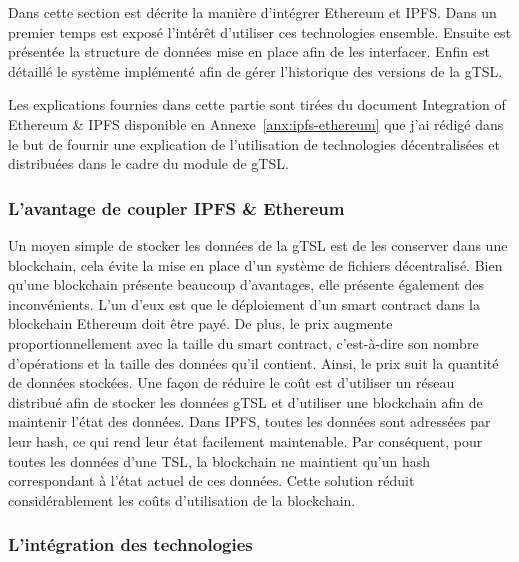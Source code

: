 \documentclass{tnreport}
\begin{document}
Dans cette section est décrite la manière d'intégrer Ethereum et IPFS. Dans un premier temps est exposé l'intérêt d'utiliser ces technologies ensemble. Ensuite est présentée la structure de données mise en place afin de les interfacer. Enfin est détaillé le système implémenté afin de gérer l'historique des versions de la gTSL.

Les explications fournies dans cette partie sont tirées du document Integration of Ethereum \& IPFS disponible en Annexe~\ref{anx:ipfs-ethereum} que j'ai rédigé dans le but de fournir une explication de l'utilisation de technologies décentralisées et distribuées dans le cadre du module de gTSL.

\subsubsection{L'avantage de coupler IPFS \& Ethereum}

Un moyen simple de stocker les données de la gTSL est de les conserver dans une blockchain, cela évite la mise en place d'un système de fichiers décentralisé. 
Bien qu'une blockchain présente beaucoup d'avantages, elle présente également des inconvénients.
L'un d'eux est que le déploiement d'un smart contract dans la blockchain Ethereum doit être payé.
De plus, le prix augmente proportionnellement avec la taille du smart contract, c'est-à-dire son nombre d'opérations et la taille des données qu'il contient.
Ainsi, le prix suit la quantité de données stockées.
Une façon de réduire le coût est d'utiliser un réseau distribué afin de stocker les données gTSL et d'utiliser une blockchain afin de maintenir l'état des données.
Dans IPFS, toutes les données sont adressées par leur hash, ce qui rend leur état facilement maintenable. Par conséquent, pour toutes les données d'une TSL, la blockchain ne maintient qu'un hash correspondant à l'état actuel de ces données. Cette solution réduit considérablement les coûts d'utilisation de la blockchain.

\subsubsection{L'intégration des technologies}
\end{document}
